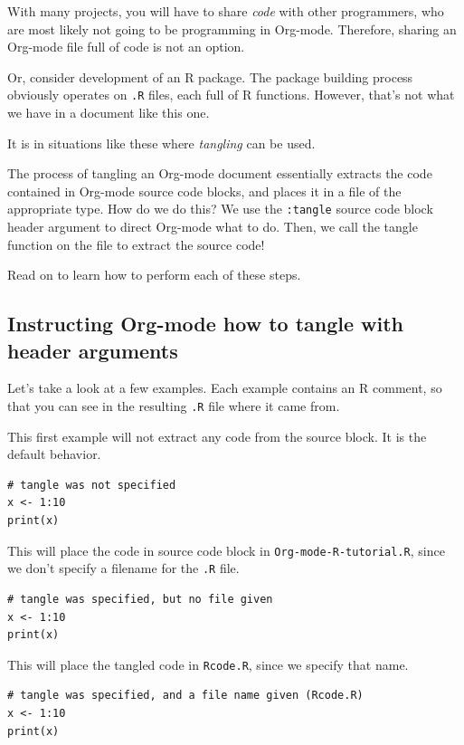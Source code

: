 \documentclass[11pt]{article}
\begin{document}
With many projects, you will have to share \emph{code} with other programmers, who are most likely not going to be programming in Org-mode. Therefore, sharing an Org-mode file full of code is not an option.

Or, consider development of an R package. The package building process obviously operates on \texttt{.R} files, each full of R functions. However, that's not what we have in a document like this one.

It is in situations like these where \emph{tangling} can be used. 

The process of tangling an Org-mode document essentially extracts the code contained in Org-mode source code blocks, and places it in a file of the appropriate type. How do we do this? We use the \texttt{:tangle} source code block header argument to direct Org-mode what to do. Then, we call the tangle function on the file to extract the source code!

Read on to learn how to perform each of these steps. 

\subsection*{Instructing Org-mode how to tangle with header arguments}
\label{sec-8-1}
Let's take a look at a few examples. Each example contains an R comment, so that you can see in the resulting \texttt{.R} file where it came from.

This first example will not extract any code from the source block. It is the default behavior. 

\begin{verbatim}
# tangle was not specified
x <- 1:10
print(x)
\end{verbatim}

This will place the code in source code block in \texttt{Org-mode-R-tutorial.R}, since we don't specify a filename for the \texttt{.R} file.

\begin{verbatim}
# tangle was specified, but no file given
x <- 1:10
print(x)
\end{verbatim}

This will place the tangled code in \texttt{Rcode.R}, since we specify that name. 

\begin{verbatim}
# tangle was specified, and a file name given (Rcode.R)
x <- 1:10
print(x)
\end{verbatim}
\end{document}
